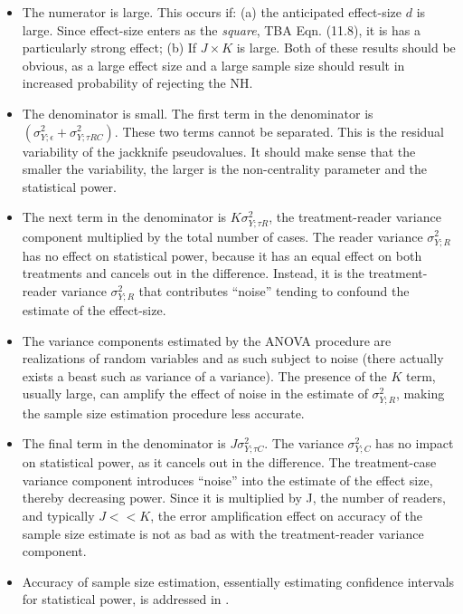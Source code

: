 \documentclass[
]{book}
\providecommand{\tightlist}{%
  \setlength{\itemsep}{0pt}\setlength{\parskip}{0pt}}
\begin{document}
\begin{itemize}
\tightlist
\item
  The numerator is large. This occurs if: (a) the anticipated effect-size \(d\) is large. Since effect-size enters as the \emph{square}, TBA Eqn. (11.8), it is has a particularly strong effect; (b) If \(J \times K\) is large. Both of these results should be obvious, as a large effect size and a large sample size should result in increased probability of rejecting the NH.
\item
  The denominator is small. The first term in the denominator is \(\left ( \sigma_{Y;\epsilon}^2 + \sigma_{Y;\tau RC}^2 \right )\). These two terms cannot be separated. This is the residual variability of the jackknife pseudovalues. It should make sense that the smaller the variability, the larger is the non-centrality parameter and the statistical power.
\item
  The next term in the denominator is \(K\sigma_{Y;\tau R}^2\), the treatment-reader variance component multiplied by the total number of cases. The reader variance \(\sigma_{Y;R}^2\) has no effect on statistical power, because it has an equal effect on both treatments and cancels out in the difference. Instead, it is the treatment-reader variance \(\sigma_{Y;R}^2\) that contributes ``noise'' tending to confound the estimate of the effect-size.
\item
  The variance components estimated by the ANOVA procedure are realizations of random variables and as such subject to noise (there actually exists a beast such as variance of a variance). The presence of the \(K\) term, usually large, can amplify the effect of noise in the estimate of \(\sigma_{Y;R}^2\), making the sample size estimation procedure less accurate.
\item
  The final term in the denominator is \(J\sigma_{Y;\tau C}^2\). The variance \(\sigma_{Y;C}^2\) has no impact on statistical power, as it cancels out in the difference. The treatment-case variance component introduces ``noise'' into the estimate of the effect size, thereby decreasing power. Since it is multiplied by J, the number of readers, and typically \(J<<K\), the error amplification effect on accuracy of the sample size estimate is not as bad as with the treatment-reader variance component.
\item
  Accuracy of sample size estimation, essentially estimating confidence intervals for statistical power, is addressed in \citep{RN2027}.
\end{itemize}
\end{document}
